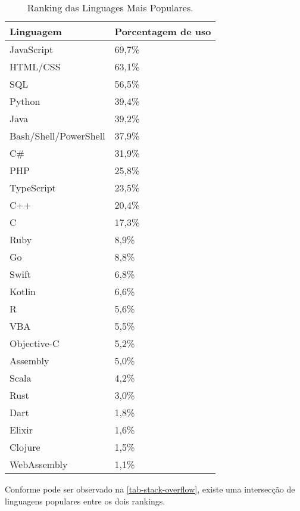 
\begin{table}[htb]
\ABNTEXfontereduzida
\caption[Ranking das Linguages Mais Populares]{Ranking das Linguages Mais Populares.}
\label{tab-stack-overflow}
\begin{tabular}{p{5cm}|p{4cm}}
   \textbf{Linguagem} & \textbf{Porcentagem de uso}  \\
    \hline
    JavaScript & 69,7\%  \\
    \hline
    HTML/CSS & 63,1\%  \\
    \hline
    SQL & 56,5\%  \\
    \hline
    Python & 39,4\%  \\
    \hline
    Java & 39,2\%  \\
    \hline
    Bash/Shell/PowerShell & 37,9\%  \\
    \hline
    C\# & 31,9\%  \\
    \hline
    PHP & 25,8\%  \\
    \hline
    TypeScript & 23,5\%  \\
    \hline
    C++ & 20,4\%  \\
    \hline
    C & 17,3\%  \\
    \hline
    Ruby & 8,9\%  \\
    \hline
    Go & 8,8\%  \\
    \hline
    Swift & 6,8\%  \\
    \hline
    Kotlin & 6,6\%  \\
    \hline
    R & 5,6\%  \\
    \hline
    VBA & 5,5\%  \\
    \hline
    Objective-C & 5,2\%  \\
    \hline
    Assembly & 5,0\%  \\
    \hline
    Scala & 4,2\%  \\
    \hline
    Rust & 3,0\%  \\
    \hline
    Dart & 1,8\%  \\
    \hline
    Elixir & 1,6\%  \\
    \hline
    Clojure & 1,5\%  \\
    \hline
    WebAssembly & 1,1\%  \\
\end{tabular}
\end{table}

\newpage
Conforme pode ser observado na \autoref{tab-stack-overflow}, existe uma intersecção de linguagens populares entre os dois rankings.

